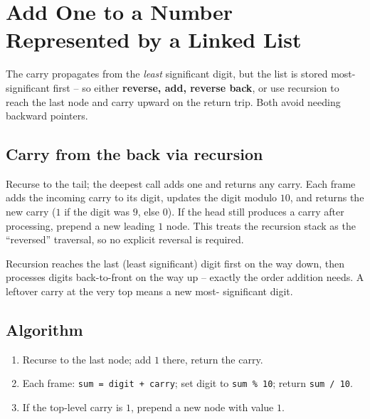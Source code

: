 \section{Add One to a Number Represented by a Linked List}
\label{sec:ll-add-one}


\begin{patternbox}
The carry propagates from the \emph{least} significant digit, but the list
is stored most-significant first -- so either \textbf{reverse, add, reverse
back}, or use recursion to reach the last node and carry upward on the
return trip. Both avoid needing backward pointers.
\end{patternbox}

\subsection*{Carry from the back via recursion}

Recurse to the tail; the deepest call adds one and returns any carry. Each
frame adds the incoming carry to its digit, updates the digit modulo $10$,
and returns the new carry ($1$ if the digit was $9$, else $0$). If the head
still produces a carry after processing, prepend a new leading $1$ node.
This treats the recursion stack as the ``reversed'' traversal, so no
explicit reversal is required.

\begin{ideabox}
Recursion reaches the last (least significant) digit first on the way down,
then processes digits back-to-front on the way up -- exactly the order
addition needs. A leftover carry at the very top means a new most-
significant digit.
\end{ideabox}

\subsection*{Algorithm}

\begin{enumerate}
  \item Recurse to the last node; add $1$ there, return the carry.
  \item Each frame: \texttt{sum = digit + carry}; set digit to
        \texttt{sum \% 10}; return \texttt{sum / 10}.
  \item If the top-level carry is $1$, prepend a new node with value $1$.
\end{enumerate}

